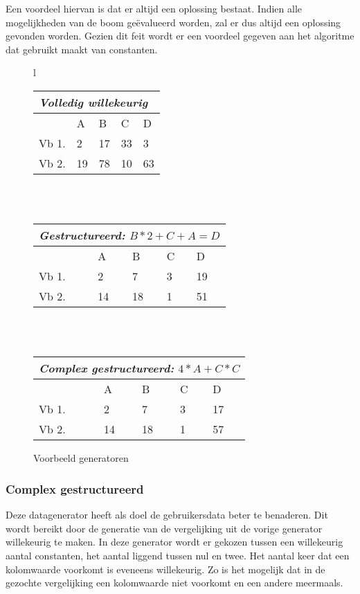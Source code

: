 \documentclass[Main.tex]{subfiles}
\begin{document}
Een voordeel hiervan is dat er altijd een oplossing bestaat. Indien alle mogelijkheden van de boom ge\"evalueerd worden, zal er dus altijd een oplossing gevonden worden. Gezien dit feit wordt er een voordeel gegeven aan het algoritme dat gebruikt maakt van constanten.

\begin{figure}[!htb]
\centering
\begin{tabular}{ l }
\begin{tabular}{@{} *5l @{}}    \toprule
\multicolumn{5}{l}{\emph{Volledig willekeurig}}\\\midrule
   & A  & B  & C  & D  \\ 
 Vb 1. & 2 & 17 & 33 & 3\\ 
 Vb 2. & 19 & 78 & 10 & 63\\\bottomrule
 \hline
\end{tabular} \\
\\
\begin{tabular}{@{} *5l @{}}    \toprule
\multicolumn{5}{l}{\emph{Gestructureerd: } $B*2+C+A = D$} \\ \midrule
   & A  & B  & C  & D  \\ 
 Vb 1. & 2 & 7 & 3 & 19\\ 
 Vb 2. & 14 & 18 & 1 & 51\\\bottomrule
 \hline
\end{tabular} \\ 
\\
\begin{tabular}{@{} *5l @{}}    \toprule
\multicolumn{5}{l}{\emph{Complex gestructureerd:}  $4*A+C*C$}\\\midrule
   & A  & B  & C  & D  \\ 
 Vb 1. & 2 & 7 & 3 & 17\\ 
 Vb 2. & 14 & 18 & 1 & 57\\ \bottomrule
 \hline
\end{tabular}
\end{tabular}
\caption{Voorbeeld generatoren}
\label{fig:randomGeneratorExample}
\end{figure}

\subsubsection*{Complex gestructureerd}
Deze datagenerator heeft als doel de gebruikersdata beter te benaderen. Dit wordt bereikt door de generatie van de vergelijking uit de vorige generator willekeurig te maken. In deze generator wordt er gekozen tussen een willekeurig aantal constanten, het aantal liggend tussen nul en twee. Het aantal keer dat een kolomwaarde voorkomt is eveneens willekeurig. Zo is het mogelijk dat in de gezochte vergelijking een kolomwaarde niet voorkomt en een andere meermaals.
\end{document}
